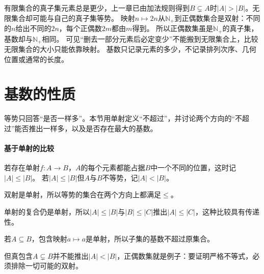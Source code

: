 有限集合的真子集元素总是更少，上一章已由加法规则得到$B\subsetneq A$时$|A|>|B|$。无限集合却可能与自己的真子集等势。
映射$n\mapsto2n$从$\mathbb N_+$到正偶数集合是双射：不同的$n$给出不同的$2n$，每个正偶数$2m$都由$m$得到。
所以正偶数集虽是$\mathbb N_+$的真子集，基数却与$\mathbb N_+$相同。
可见“删去一部分元素后必定变少”不能搬到无限集合上，比较无限集合的大小只能依靠映射。
基数只记录元素的多少，不记录排列次序、几何位置或通常的长度。

\section{基数的性质}
\label{sec:comb-cardinality-properties}

等势只回答“是否一样多”。本节用单射定义“不超过”，并讨论两个方向的“不超过”能否推出一样多，以及是否存在最大的基数。

\paragraph{基于单射的比较}
若存在单射$f:A\to B$，$A$的每个元素都能占据$B$中一个不同的位置，这时记$|A|\leq|B|$。
若$|A|\leq|B|$但$A$与$B$不等势，记$|A|<|B|$。

双射是单射，所以等势的集合在两个方向上都满足$\leq$。

单射的复合仍是单射，所以$|A|\leq|B|$与$|B|\leq|C|$推出$|A|\leq|C|$，这种比较具有传递性。

若$A\subseteq B$，包含映射$a\mapsto a$是单射，所以子集的基数不超过原集合。

但真包含$A\subsetneq B$并不能推出$|A|<|B|$，正偶数集就是例子：要证明严格不等式，必须排除一切可能的双射。


